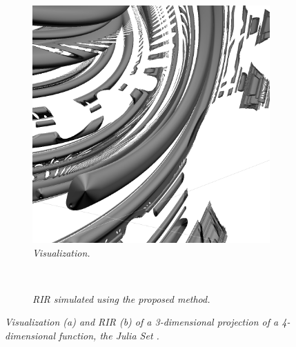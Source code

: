 \documentclass[twoside,a4paper]{article}
\begin{document}
\begin{figure}[ht]
    \center
    \begin{subfigure}[t]{0.4\linewidth}
      \centering
      \includegraphics[width=1\linewidth]{img/julia.png}
    \caption{\label{fig:juliaRend} \it Visualization. }
    \end{subfigure} \

    \begin{subfigure}[t]{0.4\linewidth}
      \centering
      
      \caption{\label{fig:juliaRIR} \it RIR simulated using the proposed method. }
    \end{subfigure}
    \caption{\it Visualization (a) and RIR (b) of a 3-dimensional projection of a 4-dimensional function, the Julia Set \cite{quilez_inigo_nodate-1} .}
    \label{fig:julia}
\end{figure}





\nocite{*}


\end{document}
